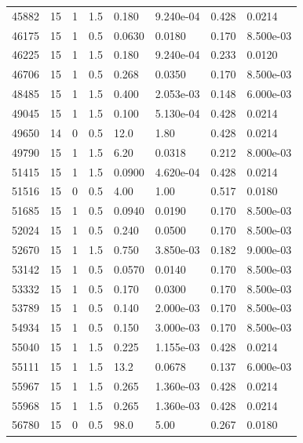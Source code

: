 \documentclass[preview]{standalone}
\begin{document}
{{{\begin{tabular}{L{1.2cm}C{1.2cm} C{0.3cm}C{0.5cm} C{1.4cm}C{1.4cm} C{1.4cm}C{1.4cm}}
  45882  &    15  & 1     & 1.5 &  0.180  & 9.240e-04  & 0.428 &  0.0214   \\ 
  46175  &    15  & 1     & 0.5 &  0.0630  & 0.0180  & 0.170 &  8.500e-03   \\ 
  46225  &    15  & 1     & 1.5 &  0.180  & 9.240e-04  & 0.233 &  0.0120   \\ 
  46706  &    15  & 1     & 0.5 &  0.268  & 0.0350  & 0.170 &  8.500e-03   \\ 
  48485  &    15  & 1     & 1.5 &  0.400  & 2.053e-03  & 0.148 &  6.000e-03   \\ 
  49045  &    15  & 1     & 1.5 &  0.100  & 5.130e-04  & 0.428 &  0.0214   \\ 
  49650  &    14  & 0     & 0.5 &  12.0  & 1.80  & 0.428 &  0.0214   \\ 
  49790  &    15  & 1     & 1.5 &  6.20  & 0.0318  & 0.212 &  8.000e-03   \\ 
  51415  &    15  & 1     & 1.5 &  0.0900  & 4.620e-04  & 0.428 &  0.0214   \\ 
  51516  &    15  & 0     & 0.5 &  4.00  & 1.00  & 0.517 &  0.0180   \\ 
  51685  &    15  & 1     & 0.5 &  0.0940  & 0.0190  & 0.170 &  8.500e-03   \\ 
  52024  &    15  & 1     & 0.5 &  0.240  & 0.0500  & 0.170 &  8.500e-03   \\ 
  52670  &    15  & 1     & 1.5 &  0.750  & 3.850e-03  & 0.182 &  9.000e-03   \\ 
  53142  &    15  & 1     & 0.5 &  0.0570  & 0.0140  & 0.170 &  8.500e-03   \\ 
  53332  &    15  & 1     & 0.5 &  0.170  & 0.0300  & 0.170 &  8.500e-03   \\ 
  53789  &    15  & 1     & 0.5 &  0.140  & 2.000e-03  & 0.170 &  8.500e-03   \\ 
  54934  &    15  & 1     & 0.5 &  0.150  & 3.000e-03  & 0.170 &  8.500e-03   \\ 
  55040  &    15  & 1     & 1.5 &  0.225  & 1.155e-03  & 0.428 &  0.0214   \\ 
  55111  &    15  & 1     & 1.5 &  13.2  & 0.0678  & 0.137 &  6.000e-03   \\ 
  55967  &    15  & 1     & 1.5 &  0.265  & 1.360e-03  & 0.428 &  0.0214   \\ 
  55968  &    15  & 1     & 1.5 &  0.265  & 1.360e-03  & 0.428 &  0.0214   \\ 
  56780  &    15  & 0     & 0.5 &  98.0  & 5.00  & 0.267 &  0.0180   \\ 

\end{tabular}}}}
\end{document}
